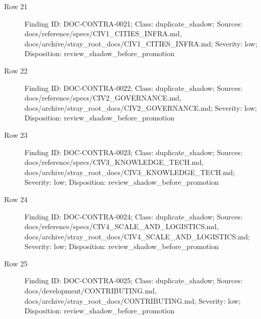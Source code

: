 \documentclass[9pt,a4paper]{book}
\begin{document}
\begin{description}
\item[Row 21] Finding ID: DOC-\allowbreak{}CONTRA-\allowbreak{}0021; Class: duplicate\_\allowbreak{}shadow; Sources: docs/\allowbreak{}reference/\allowbreak{}specs/\allowbreak{}CIV1\_\allowbreak{}CITIES\_\allowbreak{}INFRA.\allowbreak{}md, docs/\allowbreak{}archive/\allowbreak{}stray\_\allowbreak{}root\_\allowbreak{}docs/\allowbreak{}CIV1\_\allowbreak{}CITIES\_\allowbreak{}INFRA.\allowbreak{}md; Severity: low; Disposition: review\_\allowbreak{}shadow\_\allowbreak{}before\_\allowbreak{}promotion
\item[Row 22] Finding ID: DOC-\allowbreak{}CONTRA-\allowbreak{}0022; Class: duplicate\_\allowbreak{}shadow; Sources: docs/\allowbreak{}reference/\allowbreak{}specs/\allowbreak{}CIV2\_\allowbreak{}GOVERNANCE.\allowbreak{}md, docs/\allowbreak{}archive/\allowbreak{}stray\_\allowbreak{}root\_\allowbreak{}docs/\allowbreak{}CIV2\_\allowbreak{}GOVERNANCE.\allowbreak{}md; Severity: low; Disposition: review\_\allowbreak{}shadow\_\allowbreak{}before\_\allowbreak{}promotion
\item[Row 23] Finding ID: DOC-\allowbreak{}CONTRA-\allowbreak{}0023; Class: duplicate\_\allowbreak{}shadow; Sources: docs/\allowbreak{}reference/\allowbreak{}specs/\allowbreak{}CIV3\_\allowbreak{}KNOWLEDGE\_\allowbreak{}TECH.\allowbreak{}md, docs/\allowbreak{}archive/\allowbreak{}stray\_\allowbreak{}root\_\allowbreak{}docs/\allowbreak{}CIV3\_\allowbreak{}KNOWLEDGE\_\allowbreak{}TECH.\allowbreak{}md; Severity: low; Disposition: review\_\allowbreak{}shadow\_\allowbreak{}before\_\allowbreak{}promotion
\item[Row 24] Finding ID: DOC-\allowbreak{}CONTRA-\allowbreak{}0024; Class: duplicate\_\allowbreak{}shadow; Sources: docs/\allowbreak{}reference/\allowbreak{}specs/\allowbreak{}CIV4\_\allowbreak{}SCALE\_\allowbreak{}AND\_\allowbreak{}LOGISTICS.\allowbreak{}md, docs/\allowbreak{}archive/\allowbreak{}stray\_\allowbreak{}root\_\allowbreak{}docs/\allowbreak{}CIV4\_\allowbreak{}SCALE\_\allowbreak{}AND\_\allowbreak{}LOGISTICS.\allowbreak{}md; Severity: low; Disposition: review\_\allowbreak{}shadow\_\allowbreak{}before\_\allowbreak{}promotion
\item[Row 25] Finding ID: DOC-\allowbreak{}CONTRA-\allowbreak{}0025; Class: duplicate\_\allowbreak{}shadow; Sources: docs/\allowbreak{}development/\allowbreak{}CONTRIBUTING.\allowbreak{}md, docs/\allowbreak{}archive/\allowbreak{}stray\_\allowbreak{}root\_\allowbreak{}docs/\allowbreak{}CONTRIBUTING.\allowbreak{}md; Severity: low; Disposition: review\_\allowbreak{}shadow\_\allowbreak{}before\_\allowbreak{}promotion

\end{description}
\end{document}
